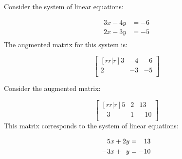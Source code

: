 \documentclass{beamer}
\begin{document}
\begin{frame}
\begin{example}
Consider the system of linear equations:

\vspace{-2mm}
\begin{equation*}
\begin{aligned}
3x -4y &= -6 \\
2x -3y &= -5 \\
\end{aligned}
\end{equation*}\pause
The augmented matrix for this system is:

\vspace{-2mm}
\begin{equation*}
\begin{bmatrix}[rr|r]
3 & -4 & -6 \\
2 & -3 & -5 \\
\end{bmatrix}
\end{equation*}
\end{example}\pause
\begin{example}
Consider the augmented matrix:

\vspace{-2mm}
\begin{equation*}
\begin{bmatrix}[rr|r]
5 & 2 & 13 \\
-3 & 1 & -10 \\
\end{bmatrix}
\end{equation*}\pause
This matrix corresponds to the system of linear equations:

\vspace{-2mm}
\begin{equation*}
\begin{aligned}
\+5x + 2y           &= \+13 \\
 -3x + \phantom{2}y &=  -10 \\
\end{aligned}
\end{equation*}
\end{example}
\end{frame}
\end{document}
